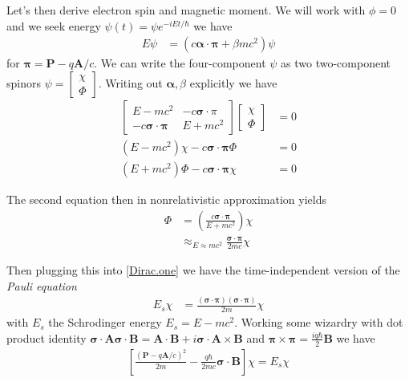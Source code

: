 \documentclass[10pt]{report}
\begin{document}
Let's then derive electron spin and magnetic moment. We will work with $\phi = 0$ and we seek energy $\psi(t) = \psi e^{-iEt/\hbar}$ we have
\begin{align}
    E\psi &= \left( c\mathbf{\alpha}\cdot \mathbf{\pi} + \beta mc^2 \right)\psi
\end{align}
for $\mathbf{\pi} = \mathbf{P} - q\mathbf{A}/c$. We can write the four-component $\psi$ as two two-component spinors $\psi = \begin{bmatrix} \chi\\ \Phi \end{bmatrix} $. Writing out $\mathbf{\alpha},\beta$ explicitly we have
\begin{align}
    \begin{bmatrix} E-mc^2 & -c\mathbf{\sigma}\cdot \pi\\-c\mathbf{\sigma}\cdot \mathbf{\pi} & E + mc^2 \end{bmatrix} \begin{bmatrix} \chi\\ \Phi \end{bmatrix} &= 0\\
    \left( E - mc^2 \right)\chi - c \mathbf{\sigma}\cdot \mathbf{\pi} \Phi &= 0\label{Dirac.one}\\
    \left( E+mc^2 \right)\Phi - c\mathbf{\sigma}\cdot \mathbf{\pi}\chi &= 0 \label{Dirac.two}
\end{align}

The second equation then in nonrelativistic approximation yields
\begin{align}
    \Phi &= \left( \frac{c\mathbf{\sigma}\cdot \mathbf{\pi}}{E + mc^2} \right)\chi\\
    &\approx_{E \approx mc^2} \frac{\mathbf{\sigma}\cdot \mathbf{\pi}}{2mc}\chi
\end{align}

Then plugging this into \ref{Dirac.one} we have the time-independent version of the \emph{Pauli equation}
\begin{align}
    E_s\chi &= \frac{\left( \mathbf{\sigma}\cdot \mathbf{\pi} \right)\left( \mathbf{\sigma}\cdot \mathbf{\pi} \right)}{2m}\chi
\end{align}
with $E_s$ the Schrodinger energy $E_s = E - mc^2$. Working some wizardry with dot product identity $\mathbf{\sigma}\cdot \mathbf{A}\mathbf{\sigma}\cdot \mathbf{B} = \mathbf{A}\cdot \mathbf{B} + i\mathbf{\sigma}\cdot \mathbf{A}\times\mathbf{B}$ and $\mathbf{\pi} \times \mathbf{\pi} = \frac{iq\hbar}{2}\mathbf{B}$ we have
\begin{align}
    \left[ \frac{\left( \mathbf{P} - q\mathbf{A}/c \right)^2}{2m} - \frac{q\hbar}{2mc}\mathbf{\sigma}\cdot \mathbf{B} \right]\chi = E_s\chi
\end{align}
\end{document}
